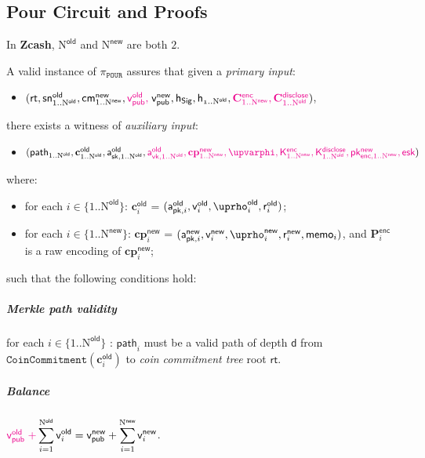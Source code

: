 \documentclass{article}
\newcommand{\changedcolor}{magenta}
\newcommand{\setchanged}{\color{\changedcolor}}
\newcommand{\changed}[1]{{\setchanged{#1}}}
\newcommand{\term}[1]{\textsl{#1}\xspace}
\newcommand{\termbf}[1]{\textbf{#1}\xspace}
\newcommand{\Zcash}{\termbf{Zcash}}
\newcommand{\coinCommitmentTree}{\term{coin commitment tree}}
\newcommand{\AuthPublicOld}[1]{\mathsf{a^{old}_{pk,\mathnormal{#1}}}}
\newcommand{\DiscloseKeyOld}[1]{\mathsf{a^{old}_{vk,\mathnormal{#1}}}}
\newcommand{\AuthPrivateOld}[1]{\mathsf{a^{old}_{sk,\mathnormal{#1}}}}
\newcommand{\AuthPublicNew}[1]{\mathsf{a^{new}_{pk,\mathnormal{#1}}}}
\newcommand{\enc}{\mathsf{enc}}
\newcommand{\disclose}{\mathsf{disclose}}
\newcommand{\EphemeralPrivate}{\mathsf{esk}}
\newcommand{\TransmitPublicNew}[1]{\mathsf{pk^{new}_{\enc,\mathnormal{#1}}}}
\newcommand{\CoinCommitRandOld}[1]{\mathsf{r^{old}_\mathnormal{#1}}}
\newcommand{\CoinCommitRandNew}[1]{\mathsf{r^{new}_\mathnormal{#1}}}
\newcommand{\CoinAddressRandOld}[1]{\mathsf{\uprho^{old}_\mathnormal{#1}}}
\newcommand{\CoinAddressRandNew}[1]{\mathsf{\uprho^{new}_\mathnormal{#1}}}
\newcommand{\CoinAddressPreRand}{\mathsf{\upvarphi}}
\newcommand{\Memo}{\mathsf{memo}}
\newcommand{\Plaintext}{\mathbf{P}}
\newcommand{\Ciphertext}{\mathbf{C}}
\newcommand{\Key}{\mathsf{K}}
\newcommand{\TransmitPlaintext}[1]{\Plaintext^\enc_{#1}}
\newcommand{\TransmitCiphertext}[1]{\Ciphertext^\enc_{#1}}
\newcommand{\TransmitKey}[1]{\Key^\enc_{#1}}
\newcommand{\DerivedKey}[1]{\Key^\disclose_{#1}}
\newcommand{\DiscloseCiphertext}[1]{\Ciphertext^\disclose_{#1}}
\newcommand{\cmNew}[1]{\mathsf{{cm}^{new}_\mathnormal{#1}}}
\newcommand{\MerkleDepth}{\mathsf{d}}
\newcommand{\snOld}[1]{\mathsf{{sn}^{old}_\mathnormal{#1}}}
\newcommand{\vsum}[2]{\smashoperator[r]{\sum_{#1}^{#2}}}
\newcommand{\rt}{\mathsf{rt}}
\newcommand{\hSig}{\mathsf{h_{Sig}}}
\newcommand{\h}[1]{\mathsf{h_{\mathnormal{#1}}}}
\newcommand{\NOld}{\mathrm{N}^\mathsf{old}}
\newcommand{\NNew}{\mathrm{N}^\mathsf{new}}
\newcommand{\PourStatement}{\texttt{POUR}}
\newcommand{\PourProof}{\pi_{\PourStatement}}
\newcommand{\vpubOld}{\mathsf{v_{pub}^{old}}}
\newcommand{\vpubNew}{\mathsf{v_{pub}^{new}}}
\newcommand{\cOld}[1]{\mathbf{c}_{#1}^\mathsf{old}}
\newcommand{\cpNew}[1]{\mathbf{cp}_{#1}^\mathsf{new}}
\newcommand{\vOld}[1]{\mathsf{v}_{#1}^\mathsf{old}}
\newcommand{\vNew}[1]{\mathsf{v}_{#1}^\mathsf{new}}
\newcommand{\treepath}[1]{\mathsf{path}_{#1}}
\newcommand{\CoinCommitment}{\mathtt{CoinCommitment}}
\begin{document}
\subsection{Pour Circuit and Proofs}

In \Zcash, $\NOld$ and $\NNew$ are both $2$.

A valid instance of $\PourProof$ assures that given a \term{primary input}:

\begin{itemize}
  \item[] $(\rt, \snOld{\mathrm{1}..\NOld}, \cmNew{\mathrm{1}..\NNew}, \changed{\vpubOld,\;}
\vpubNew, \hSig, \h{1..\NOld}, \changed{\TransmitCiphertext{1..\NNew},
\DiscloseCiphertext{1..\NOld}})$,
\end{itemize}

there exists a witness of \term{auxiliary input}:

\begin{itemize}
  \item[] $(\treepath{1..\NOld}, \cOld{1..\NOld}, \AuthPrivateOld{\mathrm{1}..\NOld},
\changed{\DiscloseKeyOld{\mathrm{1}..\NOld}, \cpNew{1..\NNew},
\CoinAddressPreRand, \TransmitKey{1..\NNew}, \DerivedKey{1..\NOld},
\TransmitPublicNew{\mathrm{1}..\NNew}, \EphemeralPrivate})$
\end{itemize}

where:

\begin{itemize}
  \item[] for each $i \in \{1..\NOld\}$: $\cOld{i}$ = $(\AuthPublicOld{i},
\vOld{i}, \CoinAddressRandOld{i}, \CoinCommitRandOld{i})$;
  \item[] for each $i \in \{1..\NNew\}$: $\cpNew{i}$ = $(\AuthPublicNew{i},
\vNew{i}, \CoinAddressRandNew{i}, \CoinCommitRandNew{i}, \Memo_i)$,
and $\TransmitPlaintext{i}$ is a raw encoding of $\cpNew{i}$;
\end{itemize}

such that the following conditions hold:

\subparagraph{Merkle path validity}

for each $i \in \{1..\NOld\}$ \changed{$\mid$ $\vOld{i} \neq 0$}:
$\treepath{i}$ must be a valid path of depth $\MerkleDepth$ from \linebreak
$\CoinCommitment(\cOld{i})$ to \coinCommitmentTree root $\rt$.

\subparagraph{Balance}

$\changed{\vpubOld\; +} \vsum{i=1}{\NOld} \vOld{i} = \vpubNew + \vsum{i=1}{\NNew} \vNew{i}$.
\end{document}
